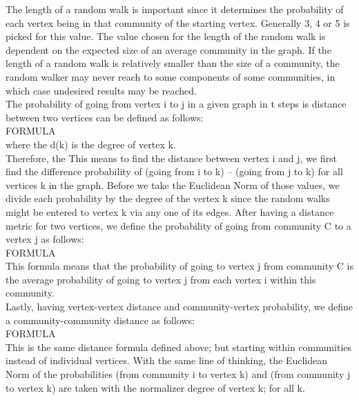 \documentclass[10pt]{article}
\begin{document}
The length of a random walk is important since it determines the probability of each vertex being in that community of the starting vertex. Generally 3, 4 or 5 is picked for this value. The value chosen for the length of the random walk is dependent on the expected size of an average community in the graph. If the length of a random walk is relatively smaller than the size of a community, the random walker may never reach to some components of some communities, in which case undesired results may be reached. \\

The probability of going from vertex i to j in a given graph in t steps is distance between two vertices can be defined as follows: \\

FORMULA \\

where the d(k) is the degree of vertex k. \\

Therefore, the 
  This means to find the distance between vertex i and j, we first find the difference probability of (going from i to k) – (going from j to k) for all vertices k in the graph. Before we take the Euclidean Norm of those values, we divide each probability by the degree of the vertex k since the random walks might be entered to vertex k via any one of its edges.
After having a distance metric for two vertices, we define the probability of going from community C to a vertex j as follows: \\

FORMULA \\

This formula means that the probability of going to vertex j from community C is the average probability of going to vertex j from each vertex i within this community. \\

Lastly, having vertex-vertex distance and community-vertex probability, we define a community-community distance as follows: \\

FORMULA \\

This is the same distance formula defined above; but starting within communities instead of individual vertices. With the same line of thinking, the Euclidean Norm of the probabilities (from community i to vertex k) and (from community j to vertex k) are taken with the normalizer degree of vertex k; for all k. \\
\end{document}
